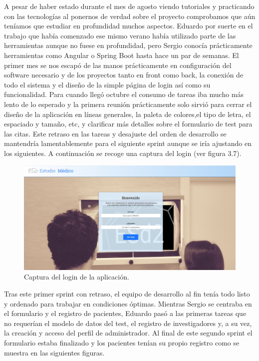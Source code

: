 A pesar de haber estado durante el mes de agosto viendo tutoriales y practicando con las tecnologías al ponernos de verdad sobre el proyecto comprobamos que aún teníamos que estudiar en profundidad muchos aspectos. Eduardo por suerte en el trabajo que había comenzado ese mismo verano había utilizado parte de las herramientas aunque no fuese en profundidad, pero Sergio conocía prácticamente herramientas como Angular o Spring Boot hasta hace un par de semanas. El primer mes se nos escapó de las manos prácticamente en configuración del software necesario y de los proyectos tanto en front como back, la conexión de todo el sistema y el diseño de la simple página de login así como su funcionalidad. Para cuando llegó octubre el consumo de tareas iba mucho más lento de lo esperado y la primera reunión prácticamente solo sirvió para cerrar el diseño de la aplicación en líneas generales, la paleta de colores,el tipo de letra, el espaciado y tamaño, etc, y clarificar más detalles sobre el formulario de test para las citas. Este retraso en las tareas y desajuste del orden de desarrollo se mantendría lamentablemente para el siguiente sprint aunque se iría ajustando en los siguientes. A continuación se recoge una captura del login (ver figura 3.7).
\newline

 \begin{figure}[h]
    \centering
     \includegraphics[width=1\textwidth]{images/login.jpg}
    \caption{Captura del login de la aplicación.}
\end{figure}
\newpage

Tras este primer sprint con retraso, el equipo de desarrollo al fin tenía todo listo y ordenado para trabajar en condiciones óptimas. Mientras Sergio se centraba en el formulario y el registro de pacientes, Eduardo pasó a las primeras tareas que no requerían el modelo de datos del test, el registro de investigadores y, a su vez, la creación y acceso del perfil de administrador. Al final de este segundo sprint el formulario estaba finalizado y los pacientes tenían su propio registro como se muestra en las siguientes figuras.
\newline

